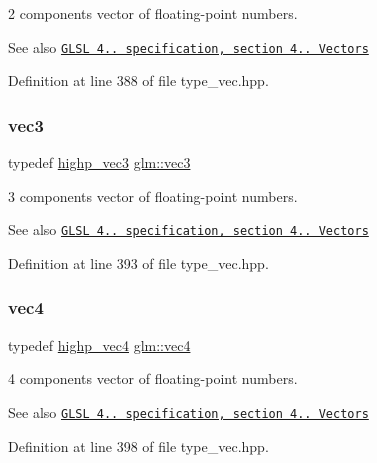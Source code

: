 2 components vector of floating-\/point numbers.

\begin{DoxySeeAlso}{See also}
\href{http://www.opengl.org/registry/doc/GLSLangSpec.4.20.8.pdf}{\tt G\+L\+SL 4.. specification, section 4.. Vectors} 
\end{DoxySeeAlso}


Definition at line 388 of file type\+\_\+vec.\+hpp.

\mbox{\label{group__core__types_ga1c47e8b3386109bc992b6c48e91b0be7}} 
\subsubsection{\texorpdfstring{vec3}{vec3}}
{\footnotesize\ttfamily typedef \hyperlink{group__core__precision_ga4879124da7a18d6b681d933cb8c4267d}{highp\+\_\+vec3} \hyperlink{group__core__types_ga1c47e8b3386109bc992b6c48e91b0be7}{glm\+::vec3}}

3 components vector of floating-\/point numbers.

\begin{DoxySeeAlso}{See also}
\href{http://www.opengl.org/registry/doc/GLSLangSpec.4.20.8.pdf}{\tt G\+L\+SL 4.. specification, section 4.. Vectors} 
\end{DoxySeeAlso}


Definition at line 393 of file type\+\_\+vec.\+hpp.

\mbox{\label{group__core__types_ga5881b1b022d7fd1b7218f5916532dd02}} 
\subsubsection{\texorpdfstring{vec4}{vec4}}
{\footnotesize\ttfamily typedef \hyperlink{group__core__precision_gae32d5f99860247afbe7ed90564bceac1}{highp\+\_\+vec4} \hyperlink{group__core__types_ga5881b1b022d7fd1b7218f5916532dd02}{glm\+::vec4}}

4 components vector of floating-\/point numbers.

\begin{DoxySeeAlso}{See also}
\href{http://www.opengl.org/registry/doc/GLSLangSpec.4.20.8.pdf}{\tt G\+L\+SL 4.. specification, section 4.. Vectors} 
\end{DoxySeeAlso}


Definition at line 398 of file type\+\_\+vec.\+hpp.

